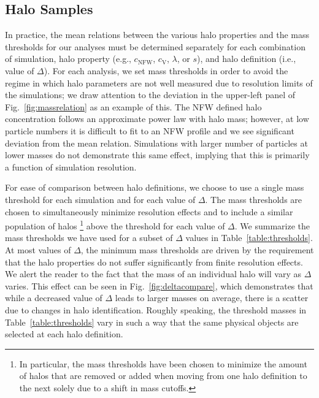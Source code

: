 \documentclass[usenatbib,fleqn]{mnras}
\begin{document}
\subsection{Halo Samples}

In practice, the mean relations between the various halo properties and the mass 
thresholds for our analyses must be determined separately for each combination of simulation, halo property (e.g., $c_{\mathrm{NFW}}$, $c_{\mathrm{V}}$, $\lambda$, or $s$), and halo definition (i.e., value of $\Delta$). For each analysis, we set mass thresholds in order to avoid the regime in which halo parameters are not well measured due to resolution limits of the simulations; we draw attention to the deviation in the upper-left panel of Fig.~\ref{fig:massrelation} as an example of this. The NFW defined halo concentration follows an approximate power law with halo mass; however, at low particle numbers it is difficult to fit to an NFW profile and we see significant deviation from the mean relation. Simulations with larger number of particles at lower masses do not demonstrate this same effect, implying that this is primarily a function of simulation resolution.

For ease of comparison between halo definitions, we choose to use a single mass threshold for each simulation and for each value of $\Delta$. The mass thresholds are chosen to simultaneously minimize resolution effects and to include a similar population of halos%
\footnote{In particular, the mass thresholds have been chosen to minimize the amount of halos that are removed or added when moving from one halo definition to the next solely due to a shift in mass cutoffs.} above the threshold for each value of $\Delta$. We summarize the mass thresholds we have used for a subset of $\Delta$ values in Table~\ref{table:thresholds}. At most values of $\Delta$, the minimum mass thresholds are driven by the requirement that the halo properties do not suffer significantly from finite resolution effects. We alert the reader to the fact that the mass of an individual halo will vary as $\Delta$ varies. This effect can be seen in Fig.~\ref{fig:deltacompare}, which demonstrates that while a decreased value of $\Delta$ leads to larger masses on average, there is a scatter due to changes in halo identification. Roughly speaking, the threshold masses in Table~\ref{table:thresholds} vary in such a way that the 
same physical objects are selected at each halo definition.
\end{document}
